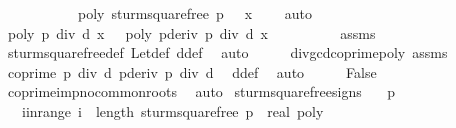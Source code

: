 \begin{isabellebody}
\ \ \ \ \ \ \ \ \ \ \ {\isachardoublequoteopen}poly\ {\isacharparenleft}sturm{\isacharunderscore}squarefree{\isacharprime}\ p\ {\isacharbang}\ {}{\isacharparenright}\ x\ {\isacharequal}\ {}{\isachardoublequoteclose}\ \isamarkupfalse%
\ auto\isanewline
\ \ \isamarkupfalse%
\ {\isachardoublequoteopen}poly\ {\isacharparenleft}p\ div\ d{\isacharparenright}\ x\ {\isacharequal}\ {}{\isachardoublequoteclose}\ {\isachardoublequoteopen}poly\ {\isacharparenleft}pderiv\ p\ div\ d{\isacharparenright}\ x\ {\isacharequal}\ {}{\isachardoublequoteclose}\isanewline
\ \ \ \ \ \ \isamarkupfalse%
\ assms{\isacharparenleft}{}{\isacharparenright}\isanewline
\ \ \ \ \ \ \isamarkupfalse%
\ sturm{\isacharunderscore}squarefree{\isacharprime}{\isacharunderscore}def\ Let{\isacharunderscore}def\ d{\isacharunderscore}def\ \isamarkupfalse%
\ auto\isanewline
\ \ \isamarkupfalse%
\ \isamarkupfalse%
\ div{\isacharunderscore}gcd{\isacharunderscore}coprime{\isacharunderscore}poly\ assms{\isacharparenleft}{}{\isacharparenright}\ \isanewline
\ \ \ \ \ \ \isamarkupfalse%
\ {\isachardoublequoteopen}coprime\ {\isacharparenleft}p\ div\ d{\isacharparenright}\ {\isacharparenleft}pderiv\ p\ div\ d{\isacharparenright}{\isachardoublequoteclose}\ \isamarkupfalse%
\ d{\isacharunderscore}def\ \isamarkupfalse%
\ auto\isanewline
\ \ \isamarkupfalse%
\ \isamarkupfalse%
\ False\ \isamarkupfalse%
\ coprime{\isacharunderscore}imp{\isacharunderscore}no{\isacharunderscore}common{\isacharunderscore}roots\ \isamarkupfalse%
\ auto\isanewline
{}\isamarkupfalse%
%
\endisatagproof
{\isafoldproof}%
%
\isadelimproof
\isanewline
%
\endisadelimproof
\isanewline
{}\isamarkupfalse%
\ sturm{\isacharunderscore}squarefree{\isacharprime}{\isacharunderscore}signs{\isacharcolon}\isanewline
\ \ \ {\isachardoublequoteopen}p\ {\isasymnoteq}\ {}{\isachardoublequoteclose}\isanewline
\ \ \ i{\isacharunderscore}in{\isacharunderscore}range{\isacharcolon}\ {\isachardoublequoteopen}i\ {\isacharless}\ length\ {\isacharparenleft}sturm{\isacharunderscore}squarefree{\isacharprime}\ {\isacharparenleft}p\ {\isacharcolon}{\isacharcolon}\ real\ poly{\isacharparenright}{\isacharparenright}\ {\isacharminus}\ {}{\isachardoublequoteclose}\ \isanewline

\end{isabellebody}
